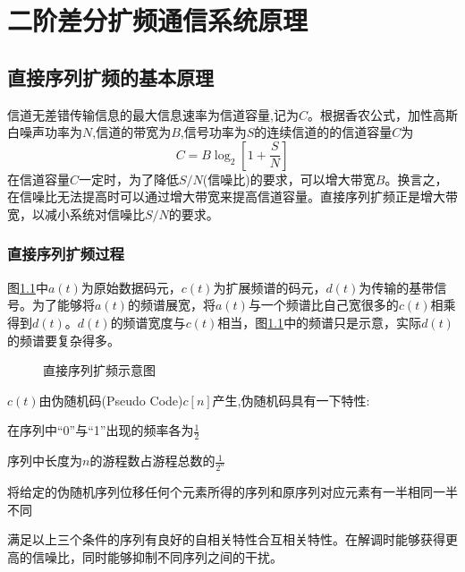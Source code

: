\chapter{二阶差分扩频通信系统原理}
\section{直接序列扩频的基本原理}
信道无差错传输信息的最大信息速率为信道容量,记为$C$。根据香农公式，加性高斯白噪声功率为$N$,信道的带宽为$B$,信号功率为$S$的连续信道的的信道容量$C$为
\begin{equation}
C=B\log_2\left[1+\frac{S}{N}\right]
\end{equation}
在信道容量$C$一定时，为了降低$S/N$(信噪比)的要求，可以增大带宽$B$。换言之，在信噪比无法提高时可以通过增大带宽来提高信道容量。直接序列扩频正是增大带宽，以减小系统对信噪比$S/N$的要求。
\subsection{直接序列扩频过程}
图\ref{fig:ddcode:dsss}中$a(t)$为原始数据码元，$c(t)$为扩展频谱的码元，$d(t)$为传输的基带信号。为了能够将$a(t)$的频谱展宽，将$a(t)$与一个频谱比自己宽很多的$c(t)$相乘得到$d(t)$。$d(t)$的频谱宽度与$c(t)$相当，图\ref{fig:ddcode:dsss}中的频谱只是示意，实际$d(t)$的频谱要复杂得多。

\begin{figure}[htbp]
	\centering
	
	\caption{直接序列扩频示意图}
	\label{fig:ddcode:dsss}
\end{figure}

$c(t)$由伪随机码(Pseudo Code)$c[n]$产生,伪随机码具有一下特性:
\begin{hitlist}
	\item 在序列中“0”与“1”出现的频率各为$\frac{1}{2}$
	\item 序列中长度为$n$的游程数占游程总数的$\frac{1}{2^n}$
	\item 将给定的伪随机序列位移任何个元素所得的序列和原序列对应元素有一半相同一半不同
\end{hitlist}

满足以上三个条件的序列有良好的自相关特性合互相关特性。在解调时能够获得更高的信噪比，同时能够抑制不同序列之间的干扰。
